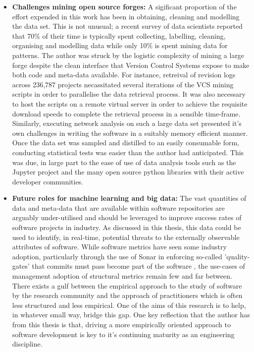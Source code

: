 \begin{itemize}
\item  \textbf{Challenges mining open source forges: } A sigificant proportion of the effort expended in this work has been in obtaining, cleaning and modelling the data set. This is not unusual; a recent survey of data scientists reported that 70\% of their time is typically spent collecting, labelling, cleaning, organising and modelling data while only 10\% is spent mining data for patterns. The author was struck by the logistic complexity of mining a large forge despite the clean interface that Version Control Systems expose to make both code and meta-data available. For instance, retreival of revision logs across 236,787 projects necassitated several iterations of the VCS mining scripts in order to parallelise the data retrieval process. It was also necessary to  host the scripts on a remote virtual server in order to achieve the requisite download speeds to complete the retrieval process in a sensible time-frame. Similarly, executing network analysis on such a large data set presented it's own challenges in writing the software in a suitably memory efficient manner. Once the data set was sampled and distilled to an easily consumable form, conducting statistical tests was easier than the author had anticipated. This was due, in large part to the ease of use of data analysis tools such as the Jupyter project and the many open source python libraries with their active developer communities.

\item  \textbf{Future roles for machine learning and big data: } The vast quantities of data and meta-data that are available within software repositories are arguably under-utilised and should be leveraged to improve success rates of software projects in industry. As discussed in this thesis, this data could be used to identify, in real-time, potential threats to the externally observable attributes of software. While software metrics have seen some industry adoption, particularly through the use of Sonar  in enforcing so-called 'quality-gates' that commits must pass become part of the software \citep{ampatzoglou2018framework}, the use-cases of management adoption of  structural metrics remain few and far between. There exists a gulf between the empirical approach to the study of software by the research community and the approach of practitioners which is often less structured and less empirical. One of the aims of this research is to help, in whatever small way, bridge this gap. One key reflection that the author has from this thesis is that, driving a more empirically oriented approach to software development is key to it's continuing maturity as an engineering discipline.


\end{itemize}

